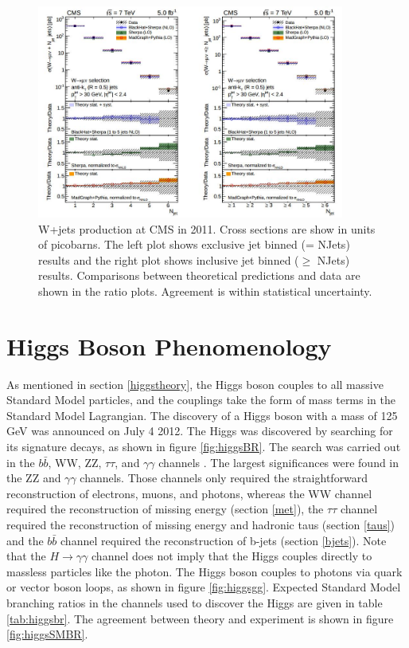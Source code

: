 \documentclass[oneside, letterpaper, oldfontcommands]{memoir}
\begin{document}
\begin{figure}[here]
\includegraphics[width=0.9\textwidth]{wjets7TeV.jpg}
\caption{W+jets production at CMS in 2011. Cross sections are show in units of picobarns. The left plot shows exclusive jet binned (= NJets) results and the right plot shows inclusive jet binned ($\geq$ NJets) results. Comparisons between theoretical predictions and data are shown in the ratio plots. Agreement is within statistical uncertainty. }
\label{fig:wjets7TeV}
\end{figure}


\section{Higgs Boson Phenomenology}\label{higgspheno}
\qquad As mentioned in section \ref{higgstheory}, the Higgs boson couples to all massive Standard Model particles, and the couplings take the form of mass terms in the Standard Model Lagrangian. The discovery of a Higgs boson with a mass of 125 GeV was announced on July 4 2012. The Higgs was discovered by searching for its signature decays, as shown in figure \ref{fig:higgsBR}. The search was carried out in the $b\bar{b}$, WW, ZZ, $\tau\tau$, and $\gamma\gamma$ channels \cite{Khachatryan:2016vau}. The largest significances were found in the ZZ and $\gamma\gamma$ channels. Those channels only required the straightforward reconstruction of electrons, muons, and photons, whereas the WW channel required the reconstruction of missing energy (section \ref{met}), the $\tau\tau$ channel required the reconstruction of missing energy and hadronic taus (section \ref{taus}) and the $b\bar{b}$ channel required the reconstruction of b-jets (section \ref{bjets}). Note that the $H \rightarrow \gamma\gamma$ channel does not imply that the Higgs couples directly to massless particles like the photon. The Higgs boson couples to photons via quark or vector boson loops, as shown in figure \ref{fig:higgsgg}. Expected Standard Model branching ratios in the channels used to discover the Higgs are given in table \ref{tab:higgsbr}. The agreement between theory and experiment is shown in figure \ref{fig:higgsSMBR}. 
\end{document}
